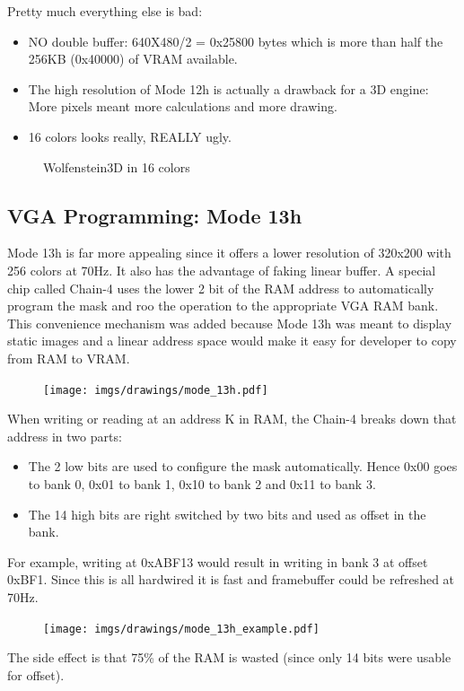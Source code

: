 \documentclass[book.tex]{subfiles}
\begin{document}
Pretty much everything else is bad:\\
\begin{itemize}
\item NO double buffer: 640X480/2 = 0x25800 bytes which is more than half the 256KB (0x40000) of VRAM available.
\item The high resolution of Mode 12h is actually a drawback for a 3D engine: More pixels meant more calculations and more drawing.
\item 16 colors looks really, REALLY ugly.
\end{itemize}

 \begin{figure}[H]
\centering
 \caption{Wolfenstein3D in 16 colors}
\end{figure}





 
  \subsection{VGA Programming: Mode 13h}
  Mode 13h is far more appealing since it offers a lower resolution of 320x200 with 256 colors at 70Hz. It also has the advantage of faking linear buffer. A special chip called Chain-4 uses the lower 2 bit of the RAM address to automatically program the mask and roo the operation to the appropriate VGA RAM bank. This convenience mechanism was added because Mode 13h was meant to display static images and a linear address space would make it easy for developer to copy from RAM to VRAM.\\
  \par
 \begin{figure}[H]
\centering
      \texttt{[image: imgs/drawings/mode\_13h.pdf]}
\end{figure}
\par

When writing or reading at an address K in RAM, the Chain-4 breaks down that address in two parts:
\begin{itemize}
\item The 2 low bits are used to configure the mask automatically. Hence 0x00 goes to bank 0, 0x01 to bank 1, 0x10 to bank 2 and 0x11 to bank 3.
\item The 14 high bits are right switched by two bits and used as offset in the bank.
\end{itemize}
  \par
  For example, writing at 0xABF13 would result in writing in bank 3 at offset 0xBF1. Since this is all hardwired it is fast and framebuffer could be refreshed at 70Hz.
 \begin{figure}[H]
\centering
      \texttt{[image: imgs/drawings/mode\_13h\_example.pdf]}
\end{figure}
\par
The side effect is that 75\% of the RAM is wasted (since only 14 bits were usable for offset).\\
\end{document}
